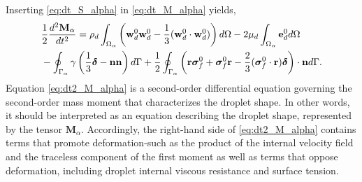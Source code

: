 Inserting \ref{eq:dt_S_alpha} in  \ref{eq:dt_M_alpha} yields,
\begin{align}    
    &\frac{1}{2}\frac{d^2 \textbf{M}_\alpha}{dt^2}
    =  \rho_d\intO{\left(\textbf{w}_d^0 \textbf{w}_d^0 -\frac{1}{3} (\textbf{w}_d^0 \cdot  \textbf{w}_d^0)\right)}
    - 2\mu_d\intO{\textbf{e}_d^0} \nonumber\\
    &- \intS{\gamma  
        \left( \frac{1}{3}\bm\delta - \textbf{nn} \right)
    }
    + \frac{1}{2}\intS{\left(\textbf{r}\bm\sigma_f^0+\bm\sigma_f^0\textbf{r}-\frac{2}{3}(\bm\sigma_f^0 \cdot \textbf{r})\bm\delta \right)\cdot \textbf{n}}.
    \label{eq:dt2_M_alpha}
\end{align}
Equation \ref{eq:dt2_M_alpha} is a second-order differential equation governing the second-order mass moment that characterizes the droplet shape. 
In other words, it should be interpreted as an equation describing the droplet shape, represented by the tensor $\textbf{M}_\alpha$.
Accordingly, the right-hand side of \ref{eq:dt2_M_alpha} contains terms that promote deformation-such as the product of the internal velocity field and the traceless component of the first moment as well as terms that oppose deformation, including droplet internal viscous resistance and surface tension.
